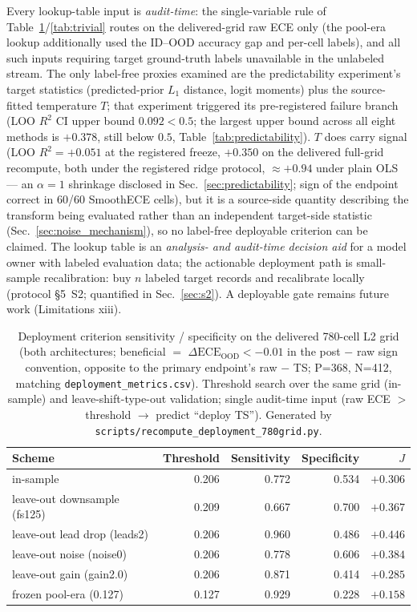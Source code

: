 \documentclass[final,5p,times,nonatbib]{elsarticle}
\begin{document}
Every lookup-table input is
\emph{audit-time}: the single-variable rule of
Table~\ref{tab:deploy_sens}/\ref{tab:trivial} routes on the delivered-grid
raw ECE only (the pool-era lookup additionally used the ID--OOD accuracy
gap and per-cell labels), and all such inputs
requiring target ground-truth labels unavailable in the unlabeled stream. The only label-free proxies examined are the predictability
experiment's target statistics (predicted-prior $L_1$ distance, logit
moments) plus the source-fitted temperature $T$; that experiment
triggered its pre-registered failure branch
(LOO $R^2$ CI upper bound $0.092 < 0.5$; the largest upper bound across
all eight methods is $+0.378$, still below $0.5$,
Table~\ref{tab:predictability}).
$T$ does carry signal (LOO $R^2 = +0.051$ at the registered freeze,
$+0.350$ on the delivered full-grid recompute, both under the registered ridge
protocol, $\approx+0.94$ under plain OLS --- an $\alpha{=}1$ shrinkage
disclosed in Sec.~\ref{sec:predictability}; sign of the endpoint correct
in 60/60 SmoothECE cells),
but it is a source-side quantity describing the
transform being evaluated rather than an independent target-side
statistic (Sec.~\ref{sec:noise_mechanism}), so no label-free deployable
criterion can be claimed. The lookup table is
an \emph{analysis- and audit-time decision aid} for a model owner with
labeled evaluation data; the actionable deployment path is small-sample
recalibration: buy $n$ labeled target records and recalibrate locally
(protocol \S5~S2; quantified in Sec.~\ref{sec:s2}). A deployable gate
remains future work
(Limitations xiii).

\begin{table}[t]
\centering
\caption{Deployment criterion sensitivity / specificity on the delivered
780-cell L2 grid (both architectures; beneficial $=$
$\Delta\text{ECE}_{\text{OOD}}<-0.01$ in the post $-$ raw sign
convention, opposite to the primary endpoint's raw $-$ TS; P=368,
N=412, matching
\texttt{deployment\_metrics.csv}). Threshold search over the same grid
(in-sample) and leave-shift-type-out validation; single audit-time input
(raw ECE $>$ threshold $\rightarrow$ predict ``deploy TS''). Generated by
\texttt{scripts/recompute\_deployment\_780grid.py}.}
\label{tab:deploy_sens}
\begin{tabular}{lrrrr}
\toprule
Scheme & Threshold & Sensitivity & Specificity & $J$ \\
\midrule
in-sample                & 0.206 & 0.772 & 0.534 & $+0.306$ \\
leave-out downsample (fs125)  & 0.209 & 0.667 & 0.700 & $+0.367$ \\
leave-out lead drop (leads2)  & 0.206 & 0.960 & 0.486 & $+0.446$ \\
leave-out noise (noise0)      & 0.206 & 0.778 & 0.606 & $+0.384$ \\
leave-out gain (gain2.0)      & 0.206 & 0.871 & 0.414 & $+0.285$ \\
frozen pool-era (0.127)  & 0.127 & 0.929 & 0.228 & $+0.158$ \\
\bottomrule
\end{tabular}
\end{table}
\end{document}
